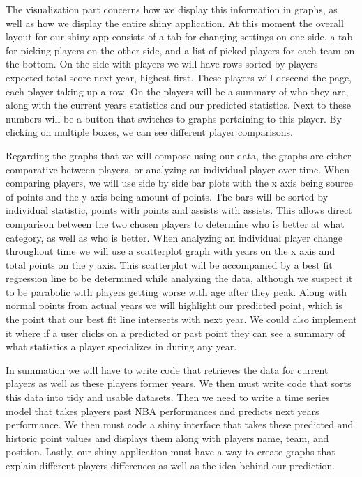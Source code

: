 \documentclass[]{article}
\begin{document}
The visualization part concerns how we display this information in
graphs, as well as how we display the entire shiny application. At this
moment the overall layout for our shiny app consists of a tab for
changing settings on one side, a tab for picking players on the other
side, and a list of picked players for each team on the bottom. On the
side with players we will have rows sorted by players expected total
score next year, highest first. These players will descend the page,
each player taking up a row. On the players will be a summary of who
they are, along with the current years statistics and our predicted
statistics. Next to these numbers will be a button that switches to
graphs pertaining to this player. By clicking on multiple boxes, we can
see different player comparisons.

Regarding the graphs that we will compose using our data, the graphs are
either comparative between players, or analyzing an individual player
over time. When comparing players, we will use side by side bar plots
with the x axis being source of points and the y axis being amount of
points. The bars will be sorted by individual statistic, points with
points and assists with assists. This allows direct comparison between
the two chosen players to determine who is better at what category, as
well as who is better. When analyzing an individual player change
throughout time we will use a scatterplot graph with years on the x axis
and total points on the y axis. This scatterplot will be accompanied by
a best fit regression line to be determined while analyzing the data,
although we suspect it to be parabolic with players getting worse with
age after they peak. Along with normal points from actual years we will
highlight our predicted point, which is the point that our best fit line
intersects with next year. We could also implement it where if a user
clicks on a predicted or past point they can see a summary of what
statistics a player specializes in during any year.

In summation we will have to write code that retrieves the data for
current players as well as these players former years. We then must
write code that sorts this data into tidy and usable datasets. Then we
need to write a time series model that takes players past NBA
performances and predicts next years performance. We then must code a
shiny interface that takes these predicted and historic point values and
displays them along with players name, team, and position. Lastly, our
shiny application must have a way to create graphs that explain
different players differences as well as the idea behind our prediction.
\end{document}
